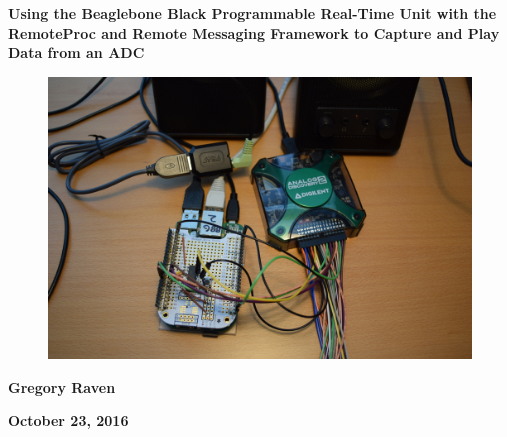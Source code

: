 \thispagestyle{empty}
{\centering\bfseries\color{black}\Huge
Using the Beaglebone Black Programmable Real-Time Unit with the RemoteProc and Remote Messaging Framework to Capture and Play Data from an ADC
\par}

\bigskip

\begin{figure}
	\centering
	\includegraphics[width=\textwidth]{photos/DSC_0021}
\end{figure}

\bigskip
{\centering\bfseries\Large
Gregory Raven
\par}


\bigskip
{\centering\bfseries\LARGE
October 23, 2016
\par}



